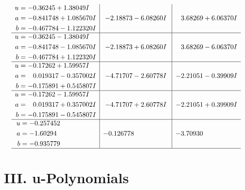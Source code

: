 \documentclass[1p]{elsarticle_modified}
\theoremstyle{definition}
\begin{document}
$$\begin{array}{c|c|c}
\begin{aligned}
u &= -0.36245 + 1.38049 I \\
a &= -0.841748 + 1.085670 I \\
b &= -0.467784 - 1.122320 I\end{aligned}
 & -2.18873 - 6.08260 I & \phantom{-}3.68269 + 6.06370 I \\ \hline\begin{aligned}
u &= -0.36245 - 1.38049 I \\
a &= -0.841748 - 1.085670 I \\
b &= -0.467784 + 1.122320 I\end{aligned}
 & -2.18873 + 6.08260 I & \phantom{-}3.68269 - 6.06370 I \\ \hline\begin{aligned}
u &= -0.17262 + 1.59957 I \\
a &= \phantom{-}0.019317 - 0.357002 I \\
b &= -0.175891 + 0.545807 I\end{aligned}
 & -4.71707 - 2.60778 I & -2.21051 - 0.39909 I \\ \hline\begin{aligned}
u &= -0.17262 - 1.59957 I \\
a &= \phantom{-}0.019317 + 0.357002 I \\
b &= -0.175891 - 0.545807 I\end{aligned}
 & -4.71707 + 2.60778 I & -2.21051 + 0.39909 I \\ \hline\begin{aligned}
u &= -0.257452\phantom{ +0.000000I} \\
a &= -1.60294\phantom{ +0.000000I} \\
b &= -0.935779\phantom{ +0.000000I}\end{aligned}
 & -0.126778\phantom{ +0.000000I} & -3.70930\phantom{ +0.000000I}\\
 \hline 
 \end{array}$$\newpage
\newpage\renewcommand{\arraystretch}{1}
\centering \section*{ III. u-Polynomials}
\end{document}
